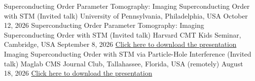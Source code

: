 

\begin{cventries}

	\cventry
	{} %
	{Superconducting Order Parameter Tomography: Imaging Superconducting Order with STM (Invited talk)} %
	{University of Pennsylvania, Philadelphia, USA} %
	{October 12, 2026} %
	{
	}
	\vspace{-1.5mm}
\cventry
{} %
{Superconducting Order Parameter Tomography: Imaging Superconducting Order with STM (Invited talk)} %
{Harvard CMT Kids Seminar, Cambridge, USA} %
{September 8, 2026} %
{
}
\vspace{-1.5mm}
	\cventry
{\href{https://docs.google.com/presentation/d/1C0MD8s13WkFd5vLBB45GIYMHfWi9kn8X/edit?usp=sharing&ouid=105264388550874489858&rtpof=true&sd=true}{Click \underline{here} to download the presentation}} %
{Imaging Superconducting Order with STM via Particle-Hole Interference (Invited talk)} %
{Maglab CMS Journal Club, Tallahassee, Florida, USA (remotely)} %
{August 18, 2026} %
{
}
\vspace{-1.5mm}
	\cventry
{\href{https://drive.google.com/file/d/1Kb1NMF32N2NyHCcRs3w9tzaEQapEs6Pq/view?usp=sharing}{Click \underline{here} to download the presentation}} %

\end{cventries}
